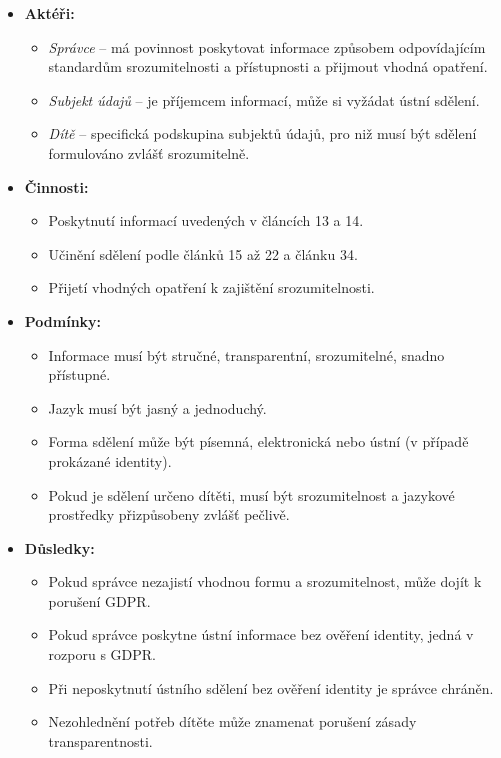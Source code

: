 \begin{itemize}
\item \textbf{Aktéři:}
  \begin{itemize}
    \item \textit{Správce} – má povinnost poskytovat informace způsobem odpovídajícím standardům srozumitelnosti a přístupnosti a přijmout vhodná opatření.
    \item \textit{Subjekt údajů} – je příjemcem informací, může si vyžádat ústní sdělení.
    \item \textit{Dítě} – specifická podskupina subjektů údajů, pro niž musí být sdělení formulováno zvlášť srozumitelně.
  \end{itemize}

\item \textbf{Činnosti:}
  \begin{itemize}
    \item Poskytnutí informací uvedených v článcích 13 a 14.
    \item Učinění sdělení podle článků 15 až 22 a článku 34.
    \item Přijetí vhodných opatření k zajištění srozumitelnosti.
  \end{itemize}

\item \textbf{Podmínky:}
  \begin{itemize}
    \item Informace musí být stručné, transparentní, srozumitelné, snadno přístupné.
    \item Jazyk musí být jasný a jednoduchý.
    \item Forma sdělení může být písemná, elektronická nebo ústní (v případě prokázané identity).
    \item Pokud je sdělení určeno dítěti, musí být srozumitelnost a jazykové prostředky přizpůsobeny zvlášť pečlivě.
  \end{itemize}

\item \textbf{Důsledky:}
  \begin{itemize}
    \item Pokud správce nezajistí vhodnou formu a srozumitelnost, může dojít k porušení GDPR.
    \item Pokud správce poskytne ústní informace bez ověření identity, jedná v rozporu s GDPR.
    \item Při neposkytnutí ústního sdělení bez ověření identity je správce chráněn.
    \item Nezohlednění potřeb dítěte může znamenat porušení zásady transparentnosti.
  \end{itemize}


\end{itemize}
